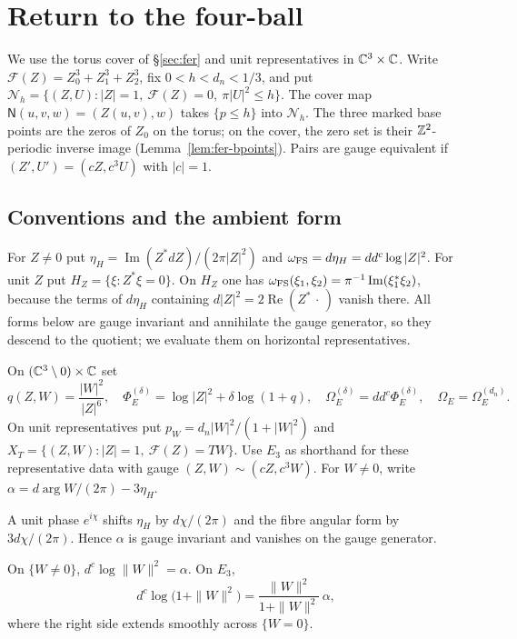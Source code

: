 \section{Return to the four-ball}\label{sec:rtc}

We use the torus cover of \S\ref{sec:fer} and unit representatives in $\mathbb{C}^3\times\mathbb{C}$. Write $\mathcal F(Z)=Z_0^3+Z_1^3+Z_2^3$, fix $0<h<d_n<1/3$, and put $\mathcal N_h=\{(Z,U):|Z|=1,\ \mathcal F(Z)=0,\ \pi|U|^2\le h\}$. The cover map $\mathsf N(u,v,w)=(Z(u,v),w)$ takes $\{p\le h\}$ into $\mathcal N_h$. The three marked base points are the zeros of $Z_0$ on the torus; on the cover, the zero set is their $\mathbb{Z}^2$-periodic inverse image (Lemma~\ref{lem:fer-bpoints}). Pairs are gauge equivalent if $(Z',U')=(cZ,c^3U)$ with $|c|=1$.

\subsection{Conventions and the ambient form}\label{sec:rtc-conventions}

For $Z\ne0$ put $\eta_H=\operatorname{Im}(Z^*dZ)/(2\pi|Z|^2)$ and $\omega_{\rm FS}=d\eta_H=dd^c\log|Z|^2$. For unit $Z$ put $H_Z=\{\xi:Z^*\xi=0\}$. On $H_Z$ one has $\omega_{\rm FS}(\xi_1,\xi_2)=\pi^{-1}\operatorname{Im}(\xi_1^*\xi_2)$, because the terms of $d\eta_H$ containing $d|Z|^2=2\operatorname{Re}(Z^*\,\cdot\,)$ vanish there. All forms below are gauge invariant and annihilate the gauge generator, so they descend to the quotient; we evaluate them on horizontal representatives.

\begin{definition}\label{def:rtc-ambient}
On $(\mathbb{C}^3\setminus0)\times\mathbb{C}$ set
\[
 q(Z,W)=\frac{|W|^2}{|Z|^6},\quad
 \Phi_E^{(\delta)}=\log|Z|^2+\delta\log(1+q),\quad
 \Omega_E^{(\delta)}=dd^c\Phi_E^{(\delta)},\quad \Omega_E=\Omega_E^{(d_n)}.
\]
On unit representatives put $p_W=d_n|W|^2/(1+|W|^2)$ and
$X_T=\{(Z,W):|Z|=1,\ \mathcal F(Z)=TW\}$.
Use $E_3$ as shorthand for these representative data with gauge $(Z,W)\sim(cZ,c^3W)$.
For $W\ne0$, write $\alpha=d\arg W/(2\pi)-3\eta_H$.
\end{definition}

A unit phase $e^{i\chi}$ shifts $\eta_H$ by $d\chi/(2\pi)$ and the fibre angular form by $3d\chi/(2\pi)$. Hence $\alpha$ is gauge invariant and vanishes on the gauge generator.

\begin{lemma}\label{lem:rtc-dc}
On $\{W\ne0\}$, $d^c\log\|W\|^2=\alpha$. On $E_3$,
\[
 d^c\log\big(1+\|W\|^2\big)=\frac{\|W\|^2}{1+\|W\|^2}\,\alpha ,
\]
where the right side extends smoothly across $\{W=0\}$.
\end{lemma}

